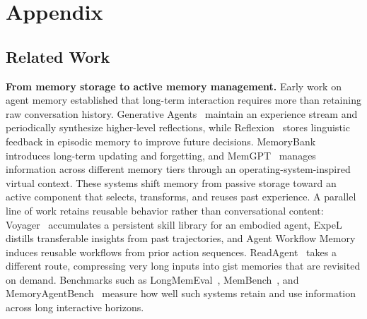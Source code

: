 \documentclass[11pt]{article}
\begin{document}

%


\newpage
\appendix
\section{Appendix}
\label{sec:appendix}
\subsection{Related Work}
\label{sec:relatedwork}

\noindent\textbf{From memory storage to active memory management.}
Early work on agent memory established that long-term interaction requires more than retaining raw conversation history. Generative Agents~\citep{park2023generative} maintain an experience stream and periodically synthesize higher-level reflections, while Reflexion~\citep{shinn2023reflexion} stores linguistic feedback in episodic memory to improve future decisions. MemoryBank~\citep{zhong2024memorybank} introduces long-term updating and forgetting, and MemGPT~\citep{packer2023memgpt} manages information across different memory tiers through an operating-system-inspired virtual context. These systems shift memory from passive storage toward an active component that selects, transforms, and reuses past experience. A parallel line of work retains reusable behavior rather than conversational content: Voyager~\citep{wang2023voyager} accumulates a persistent skill library for an embodied agent, ExpeL~\citep{zhao2024expelllmagentsexperiential} distills transferable insights from past trajectories, and Agent Workflow Memory~\citep{wang2025workflowmemory} induces reusable workflows from prior action sequences. ReadAgent~\citep{lee2024human} takes a different route, compressing very long inputs into gist memories that are revisited on demand. Benchmarks such as LongMemEval~\citep{wu2024longmemeval}, MemBench~\citep{tan2025membench}, and MemoryAgentBench~\citep{hu2025memoryagentbench} measure how well such systems retain and use information across long interactive horizons.
\end{document}
